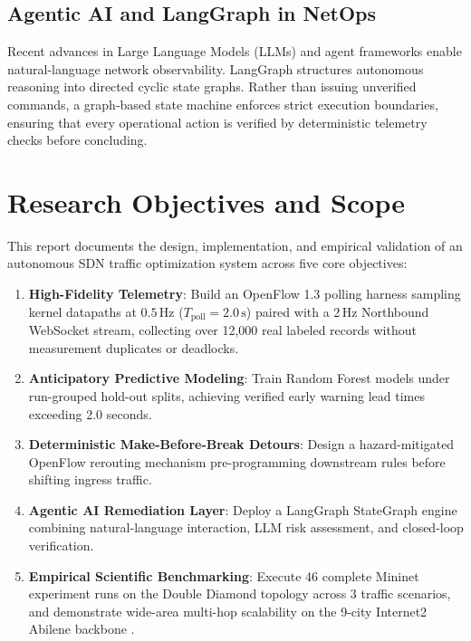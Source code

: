 \subsection{Agentic AI and LangGraph in NetOps}
Recent advances in Large Language Models (LLMs) and agent frameworks \cite{langgraph2024} enable natural-language network observability. LangGraph structures autonomous reasoning into directed cyclic state graphs. Rather than issuing unverified commands, a graph-based state machine enforces strict execution boundaries, ensuring that every operational action is verified by deterministic telemetry checks before concluding.

\section{Research Objectives and Scope}
This report documents the design, implementation, and empirical validation of an autonomous SDN traffic optimization system across five core objectives:
\begin{enumerate}[label=\textbf{RO\arabic*.},noitemsep,topsep=2pt]
  \item \textbf{High-Fidelity Telemetry}: Build an OpenFlow 1.3 polling harness sampling kernel datapaths at $0.5\,\text{Hz}$ ($T_{\text{poll}} = 2.0\,\text{s}$) paired with a 2\,Hz Northbound WebSocket stream, collecting over 12,000 real labeled records without measurement duplicates or deadlocks.
  \item \textbf{Anticipatory Predictive Modeling}: Train Random Forest models under run-grouped hold-out splits, achieving verified early warning lead times exceeding 2.0 seconds.
  \item \textbf{Deterministic Make-Before-Break Detours}: Design a hazard-mitigated OpenFlow rerouting mechanism pre-programming downstream rules before shifting ingress traffic.
  \item \textbf{Agentic AI Remediation Layer}: Deploy a LangGraph StateGraph engine combining natural-language interaction, LLM risk assessment, and closed-loop verification.
  \item \textbf{Empirical Scientific Benchmarking}: Execute 46 complete Mininet \cite{lantz2010network} experiment runs on the Double Diamond topology across 3 traffic scenarios, and demonstrate wide-area multi-hop scalability on the 9-city Internet2 Abilene backbone \cite{tipper2009internet2}.
\end{enumerate}
